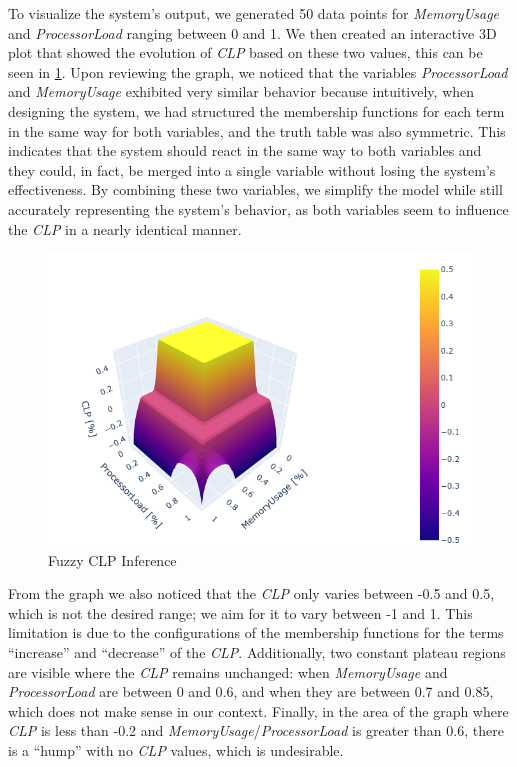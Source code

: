 \documentclass[titlepage]{article}
\begin{document}
To visualize the system's output, we generated 50 data points for \textit{MemoryUsage} and \textit{ProcessorLoad} ranging between 0 and 1.
We then created an interactive 3D plot that showed the evolution of \textit{CLP} based on these two values, this can be seen in \cref{fig:3d_triangular}.
Upon reviewing the graph, we noticed that the variables \textit{ProcessorLoad} and \textit{MemoryUsage} exhibited very similar behavior because intuitively, when designing the system, we had structured the membership functions for each term in the same way for both variables, and the truth table was also symmetric.
This indicates that the system should react in the same way to both variables and they could, in fact, be merged into a single variable without losing the system's effectiveness.
By combining these two variables, we simplify the model while still accurately representing the system's behavior, as both variables seem to influence the \textit{CLP} in a nearly identical manner.


\begin{figure}[H]
    \centering
\includegraphics[scale = 0.7]{../images/3d_triangular}
\caption{Fuzzy CLP Inference}
\label{fig:3d_triangular}
\end{figure}


From the graph we also noticed that the \textit{CLP} only varies between -0.5 and 0.5, which is not the desired range; we aim for it to vary between -1 and 1.
This limitation is due to the configurations of the membership functions for the terms ``increase'' and ``decrease'' of the \textit{CLP}.
Additionally, two constant plateau regions are visible where the \textit{CLP} remains unchanged: when \textit{MemoryUsage} and \textit{ProcessorLoad} are between 0 and 0.6, and when they are between 0.7 and 0.85, which does not make sense in our context.
Finally, in the area of the graph where \textit{CLP} is less than -0.2 and \textit{MemoryUsage}/\textit{ProcessorLoad} is greater than 0.6, there is a ``hump'' with no \textit{CLP} values, which is undesirable.
\newline
\end{document}
